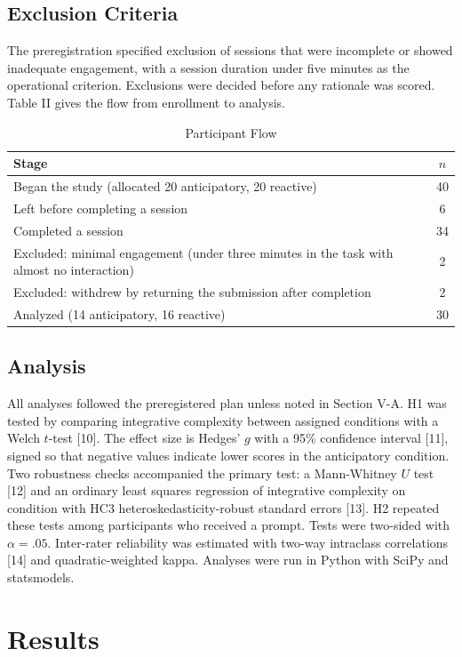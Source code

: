 \documentclass[12pt,letterpaper]{article}
\begin{document}
\subsection{Exclusion Criteria}
The preregistration specified exclusion of sessions that were incomplete or showed inadequate engagement, with a session duration under five minutes as the operational criterion. Exclusions were decided before any rationale was scored. Table II gives the flow from enrollment to analysis.

\begin{table}[ht]\centering\footnotesize
\caption{Participant Flow}
\begin{tabular}{lc}
\toprule
Stage & $n$\\
\midrule
Began the study (allocated 20 anticipatory, 20 reactive) & 40\\
Left before completing a session & 6\\
Completed a session & 34\\
Excluded: minimal engagement (under three minutes in the task with almost no interaction) & 2\\
Excluded: withdrew by returning the submission after completion & 2\\
Analyzed (14 anticipatory, 16 reactive) & 30\\
\bottomrule
\end{tabular}
\end{table}

\subsection{Analysis}
All analyses followed the preregistered plan unless noted in Section V-A. H1 was tested by comparing integrative complexity between assigned conditions with a Welch $t$-test [10]. The effect size is Hedges' $g$ with a 95\% confidence interval [11], signed so that negative values indicate lower scores in the anticipatory condition. Two robustness checks accompanied the primary test: a Mann-Whitney $U$ test [12] and an ordinary least squares regression of integrative complexity on condition with HC3 heteroskedasticity-robust standard errors [13]. H2 repeated these tests among participants who received a prompt. Tests were two-sided with $\alpha = .05$. Inter-rater reliability was estimated with two-way intraclass correlations [14] and quadratic-weighted kappa. Analyses were run in Python with SciPy and statsmodels.

\section{Results}
\end{document}
